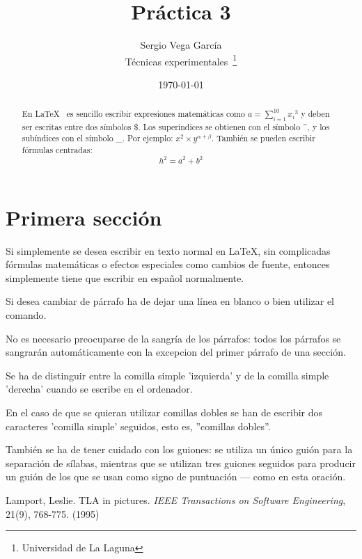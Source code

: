 \documentclass[a4paper,12pt]{article}
\begin{document}
\title{Práctica 3}
\author{Sergio Vega García \\
        Técnicas experimentales~\footnote{Universidad de La Laguna}
        }
\date{\today}
\maketitle
\begin{abstract}
   En \LaTeX{}~\cite{Lam:86} es sencillo escribir expresiones
   matemáticas como $a=\sum_{i=1}^{10} {x_i}^{3}$
   y deben ser escritas entre dos símbolos \$.
   Los superíndices se obtienen con el símbolo \^{}, y
   los subíndices con el símbolo \_.
   Por ejemplo: $x^2 \times y^{\alpha + \beta}$.
   También se pueden escribir fórmulas centradas:
   \[h^2=a^2 + b^2 \]
\end{abstract}

\section{Primera sección}
Si simplemente se desea escribir en texto normal en LaTeX,
sin complicadas f\'ormulas matem\'aticas o efectos especiales
como cambios de fuente, entonces simplemente tiene que escribir
en espa\~nol normalmente.\par
Si desea cambiar de párrafo ha de dejar una línea en blanco o bien
utilizar el comando. \par
No es necesario preocuparse de la sangría de los párrafos:
todos los párrafos se sangrarán automáticamente con la excepcion
del primer párrafo de una sección.

Se ha de distinguir entre la comilla simple 'izquierda'
y de la comilla simple 'derecha' cuando se escribe en el ordenador.

En el caso de que se quieran utilizar comillas dobles se han de
escribir dos caracteres 'comilla simple' seguidos, esto es,
''comillas dobles''.

También se ha de tener cuidado con los guiones: se utiliza un único
guión para la separación de sílabas, mientras que se utilizan
tres guiones seguidos para producir un guión de los que se usan
como signo de puntuación --- como en esta oración.



\begin{thebibliography}{00}
    Lamport, Leslie.
    TLA in pictures.
    \emph{IEEE Transactions on Software Engineering},
    21(9), 768-775.
    (1995)
\end{thebibliography}
\end{document}
